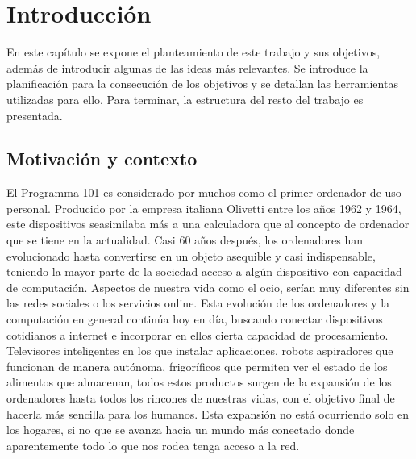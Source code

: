 \chapter{Introducción}

En este capítulo se expone el planteamiento de este trabajo y sus objetivos,
además de introducir algunas de las ideas más relevantes. Se introduce la
planificación para la consecución de los objetivos y se detallan las
herramientas utilizadas para ello. Para terminar, la estructura del resto del
trabajo es presentada.

\section{Motivación y contexto}

El Programma 101 es considerado por muchos como el primer ordenador de uso
personal. Producido por la empresa italiana Olivetti entre los años 1962 y 1964,
este dispositivos seasimilaba más a una calculadora que al concepto de ordenador
que se tiene en la actualidad. Casi 60 años después, los ordenadores han
evolucionado hasta convertirse en un objeto asequible y casi indispensable,
teniendo la mayor parte de la sociedad acceso a algún dispositivo con capacidad
de computación. Aspectos de nuestra vida como el ocio, serían muy diferentes sin
las redes sociales o los servicios online. Esta evolución de los ordenadores y
la computación en general continúa hoy en día, buscando conectar dispositivos
cotidianos a internet e incorporar en ellos cierta capacidad de procesamiento.
Televisores inteligentes en los que instalar aplicaciones, robots aspiradores
que funcionan de manera autónoma, frigoríficos que permiten ver el estado de los
alimentos que almacenan, todos estos productos surgen de la expansión de los
ordenadores hasta todos los rincones de nuestras vidas, con el objetivo final de
hacerla más sencilla para los humanos. Esta expansión no está ocurriendo solo en
los hogares, si no que se avanza hacia un mundo más conectado donde
aparentemente todo lo que nos rodea tenga acceso a la red.

